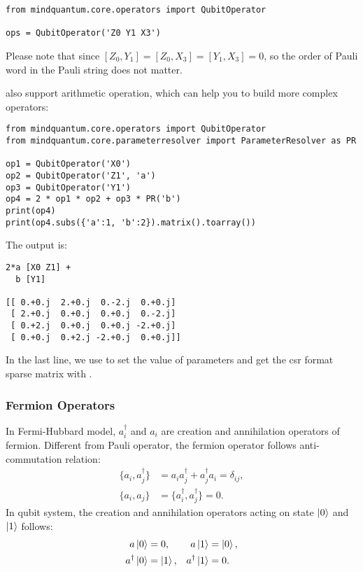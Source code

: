 \begin{lstlisting}
from mindquantum.core.operators import QubitOperator

ops = QubitOperator('Z0 Y1 X3')
\end{lstlisting}
Please note that since $[Z_0, Y_1]= [Z_0,X_3] = [Y_1, X_3]=0$, so the order of Pauli word in the Pauli string does not matter.

\QubitOperator also support arithmetic operation, which can help you to build more complex operators:

\begin{lstlisting}
from mindquantum.core.operators import QubitOperator
from mindquantum.core.parameterresolver import ParameterResolver as PR

op1 = QubitOperator('X0')
op2 = QubitOperator('Z1', 'a')
op3 = QubitOperator('Y1')
op4 = 2 * op1 * op2 + op3 * PR('b')
print(op4)
print(op4.subs({'a':1, 'b':2}).matrix().toarray())
\end{lstlisting}
The output is:
\begin{lstlisting}
2*a [X0 Z1] +
  b [Y1]

[[ 0.+0.j  2.+0.j  0.-2.j  0.+0.j]
 [ 2.+0.j  0.+0.j  0.+0.j  0.-2.j]
 [ 0.+2.j  0.+0.j  0.+0.j -2.+0.j]
 [ 0.+0.j  0.+2.j -2.+0.j  0.+0.j]]
\end{lstlisting}
In the last line, we use  to set the value of parameters and get the csr format sparse matrix with .

\subsubsection{Fermion Operators}

In Fermi-Hubbard model, $a_i^\dagger$ and $a_i$ are creation and annihilation operators of fermion. Different from Pauli operator, the fermion operator follows anti-commutation relation:
\begin{align*}
    \{a_i, a_j^\dagger\} & = a_ia_j^\dagger + a_j^\dagger a_i = \delta_{ij}, \\
    \{a_i, a_j\}         & = \{a_i^\dagger, a_j^\dagger\}=0.
\end{align*}
In qubit system, the creation and annihilation operators acting on state $\ket{0}$ and $\ket{1}$ follows:
\begin{align*}
    a\ket{0}          & =0,        & a\ket{1}          & =\ket{0}, \\
    a^\dagger \ket{0} & = \ket{1}, & a^\dagger \ket{1} & =0.
\end{align*}

